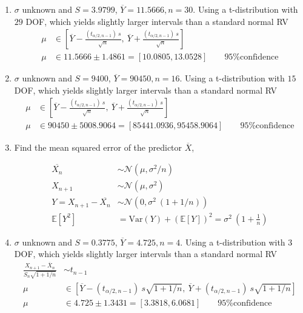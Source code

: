 \begin{enumerate}
	
	\item $ \sigma $ unknown and $ S = 3.9799 $, $ \overline{Y} = 11.5666, n = 30$. Using a t-distribution with $ 29 $ DOF, which yields slightly larger intervals than a standard normal RV\\
	
		\begin{align}
			\mu &\in \left[ \overline{Y} - \frac{(t_{\alpha/2, n-1})\ s}{\sqrt{n}}, \ \overline{Y} + \frac{(t_{\alpha/2, n-1})\ s}{\sqrt{n}} \right] \nonumber \\
			\mu &\in 11.5666 \pm 1.4861 = [10.0805, 13.0528] \qquad \text{95\% confidence} 
		\end{align}
	
	
	\item $ \sigma $ unknown and $ S = 9400 $, $ \overline{Y} = 90450, n = 16$. Using a t-distribution with $ 15 $ DOF, which yields slightly larger intervals than a standard normal RV\\
	
		\begin{align}
			\mu &\in \left[ \overline{Y} - \frac{(t_{\alpha/2, n-1})\ s}{\sqrt{n}}, \ \overline{Y} + \frac{(t_{\alpha/2, n-1})\ s}{\sqrt{n}} \right] \nonumber \\
			\mu &\in 90450 \pm 5008.9064 = [85441.0936, 95458.9064] \qquad \text{95\% confidence} 
		\end{align}
	
	
	\item Find the mean squared error of the predictor $ \overline{X} $,
	
		\begin{align}
			\overline{X_n} &\sim \mathcal{N}(\mu, \sigma^2/n) \nonumber \\
			X_{n+1} &\sim \mathcal{N}(\mu, \sigma^2) \nonumber \\
			Y = X_{n+1} - \overline{X_n} &\sim \mathcal{N}(0, \sigma^2\ (1+1/n))\nonumber \\
			\mathbb{E}[Y^2] &= \mathrm{Var}(Y) + \left(\mathbb{E}[Y]\right)^2 = \sigma^2\ \left(1+\frac{1}{n}\right)
		\end{align}
	
	
	\item $ \sigma $ unknown and $ S = 0.3775 $, $ \overline{Y} = 4.725, n = 4$. Using a t-distribution with $ 3 $ DOF, which yields slightly larger intervals than a standard normal RV\\
	
		\begin{align}
			\frac{X_{n+1} - \overline{X}_n}{S_n \sqrt{1 + 1/n}} &\sim t_{n-1} \nonumber \\
			\mu &\in \left[ \overline{Y} - (t_{\alpha/2, n-1})\ s \sqrt{1 + 1/n}, \ \overline{Y} + (t_{\alpha/2, n-1})\ s \sqrt{1 + 1/n} \right] \nonumber \\
			\mu &\in 4.725 \pm 1.3431 = [3.3818, 6.0681] \qquad \text{95\% confidence} 
		\end{align}
	

\end{enumerate}
